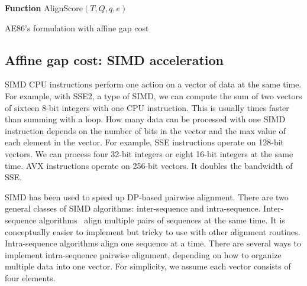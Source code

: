 \documentclass{bioinfo}
\begin{document}
\begin{algorithm}[tb]
\DontPrintSemicolon
\footnotesize
{}
\BlankLine
\textbf{Function} {\sc AlignScore}$(T,Q,q,e)$
\caption{AE86's formulation with affine gap cost}\label{algo:ae86}
\end{algorithm}

\subsection{Affine gap cost: SIMD acceleration}

SIMD CPU instructions perform one action on a vector of data at the same time.
For example, with SSE2, a type of SIMD, we can compute the sum of two vectors
of sixteen 8-bit integers with one CPU instruction. This is usually times
faster than summing with a loop. How many data can be processed with one SIMD
instruction depends on the number of bits in the vector and the max value
of each element in the vector. For example, SSE instructions operate on 128-bit
vectors. We can process four 32-bit integers or eight 16-bit integers at the
same time. AVX instructions operate on 256-bit vectors. It doubles the
bandwidth of SSE.

SIMD has been used to speed up DP-based pairwise alignment.  There are two
general classes of SIMD algorithms: inter-sequence and intra-sequence.
Inter-sequence algorithms~\citep{Rognes:2011aa} align multiple pairs of
sequences at the same time. It is conceptually easier to implement but tricky
to use with other alignment routines. Intra-sequence algorithms align one
sequence at a time.  There are several ways to implement intra-sequence
pairwise alignment, depending on how to organize multiple data into one vector.
For simplicity, we assume each vector consists of four elements.
\end{document}
